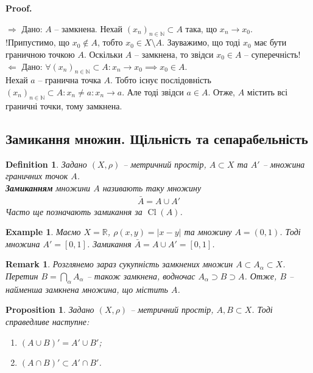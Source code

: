 \documentclass[a4paper, 10pt]{article}
\makeatletter
\def\rightproof{$\boxed{\Rightarrow}$ }
\def\leftproof{$\boxed{\Leftarrow}$ }
\theoremstyle{theoremdd}
\theoremstyle{theoremdd}
\newtheorem{definition}[theorem]{Definition}
\theoremstyle{theoremdd}
\theoremstyle{theoremdd}
\newtheorem{example}[theorem]{Example}
\theoremstyle{theoremdd}
\newtheorem{proposition}[theorem]{Proposition}
\theoremstyle{theoremdd}
\newtheorem{remark}[theorem]{Remark}
\theoremstyle{theoremdd}
\theoremstyle{theoremdd}
\renewenvironment{proof}[1][Proof.\\]{\par
\pushQED{\hfill \qed}%
\normalfont \topsep6\p@\@plus6\p@\relax
\trivlist
\item\relax
{\bfseries
#1\@addpunct{.}}\hspace\labelsep\ignorespaces
}{%
\popQED\endtrivlist\@endpefalse
}
\DeclareMathOperator{\Cl}{Cl}
\makeatother
\begin{document}
\begin{proof}
\rightproof Дано: $A$ -- замкнена. Нехай $(x_n)_{n \in \mathbb{N}} \subset A$ така, що $x_n \to x_0$.\\
!Припустимо, що $x_0 \notin A$, тобто $x_0 \in X \setminus A$. Зауважимо, що тоді $x_0$ має бути граничною точкою $A$. Оскільки $A$ -- замкнена, то звідси $x_0 \in A$ -- суперечність!
\bigskip \\
\leftproof Дано: $\forall (x_n)_{n \in \mathbb{N}} \subset A: x_n \to x_0 \implies x_0 \in A$.\\
Нехай $a$ -- гранична точка $A$. Тобто існує послідовність $(x_n)_{n \in \mathbb{N}} \subset A: x_n \neq a: x_n \to a$. Але тоді звідси $a \in A$. Отже, $A$ містить всі граничні точки, тому замкнена.
\end{proof}

\subsection{Замикання множин. Щільність та сепарабельність}
\begin{definition}
Задано $(X,\rho)$ -- метричний простір, $A \subset X$ та $A'$ -- множина граничних точок $A$.\\
\textbf{Замиканням} множини $A$ називають таку множину
\begin{align*}
\bar{A} = A \cup A'
\end{align*}
Часто ще позначають замикання за $\Cl(A)$.
\end{definition}

\begin{example}
Маємо $X = \mathbb{R}$, $\rho(x,y) = |x-y|$ та множину $A = (0,1)$. Тоді множина $A' = [0,1]$. Замикання $\bar{A} = A \cup A' = [0,1]$.
\end{example}

\begin{remark}
Розглянемо зараз сукупність замкнених множин $A \subset A_{\alpha} \subset X$. Перетин $B = \displaystyle\bigcap_{\alpha} A_{\alpha}$ -- також замкнена, водночас $A_\alpha \supset B \supset A$. Отже, $B$ -- найменша замкнена множина, що містить $A$.
\end{remark}

\begin{proposition}
Задано $(X,\rho)$ -- метричний простір, $A,B \subset X$. Тоді справедливе наступне:
\begin{enumerate}[nosep,wide=0pt,label={\arabic*)}]
\item $(A \cup B)' = A' \cup B'$;
\item $(A \cap B)' \subset A' \cap B'$.
\end{enumerate}
\end{proposition}
\end{document}
